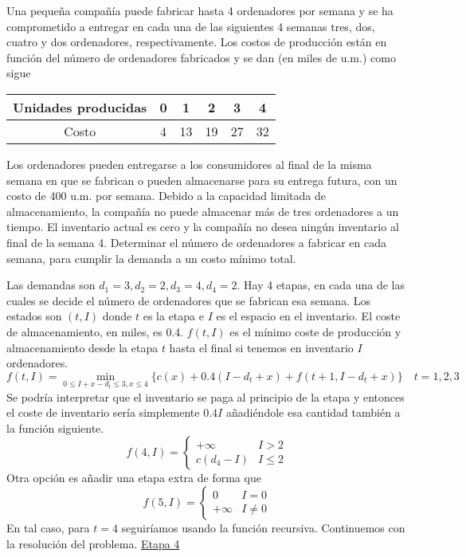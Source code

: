 \documentclass[twoside]{article}
\begin{document}
\newpage 
\begin{ejercicio}{3}
Una pequeña compañía puede fabricar hasta 4 ordenadores por semana y se ha comprometido
a entregar en cada una de las siguientes 4 semanas tres, dos, cuatro y dos ordenadores, respectivamente.
Los costos de producción están en función del número de ordenadores fabricados y se dan
(en miles de u.m.) como sigue
\begin{center}
\begin{tabular}{c| c c c c c}
Unidades producidas & 0 & 1 & 2 & 3 & 4 \\
\hline
Costo & 4 & 13 & 19 & 27 & 32
\end{tabular}
\end{center}
Los ordenadores pueden entregarse a los consumidores al final de la misma semana en que se
fabrican o pueden almacenarse para su entrega futura, con un costo de 400 u.m. por semana.
Debido a la capacidad limitada de almacenamiento, la compañía no puede almacenar más de tres
ordenadores a un tiempo. El inventario actual es cero y la compañía no desea ningún inventario
al final de la semana 4. Determinar el número de ordenadores a fabricar en cada semana, para
cumplir la demanda a un costo mínimo total.
\begin{solucion}
Las demandas son $d_1=3, d_2=2, d_3=4, d_4=2$. Hay 4 etapas, en cada una de las cuales se decide el número de ordenadores que se fabrican esa semana. Los estados son $(t, I)$ donde $t$ es la etapa e $I$ es el espacio en el inventario. El coste de almacenamiento, en miles, es 0.4. $f(t,I)$ es el mínimo coste de producción y almacenamiento desde la etapa $t$ hasta el final si tenemos en inventario $I$ ordenadores.
$$f(t,I)=\min_{0\leq I+x-d_t\leq 3,x\leq 4}\{c(x)+0.4(I-d_t+x)+f(t+1,I-d_t+x)\}\quad t=1,2,3$$
Se podría interpretar que el inventario se paga al principio de la etapa y entonces el coste de inventario sería simplemente $0.4I$ añadiéndole esa cantidad también a la función siguiente. 
$$f(4,I)=\begin{cases}
+\infty & I>2\\
c(d_4-I) & I\leq 2
\end{cases}$$
Otra opción es añadir una etapa extra de forma que 
$$f(5,I)=\begin{cases}
0 & I=0\\
+\infty & I\neq 0
\end{cases}$$
En tal caso, para $t=4$ seguiríamos usando la función recursiva. Continuemos con la resolución del problema.
\newpage
\underline{Etapa 4}
\begin{center}

\end{center}
\end{solucion}
\end{ejercicio}
\end{document}
